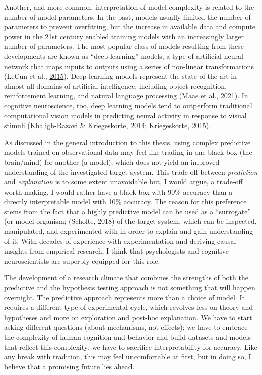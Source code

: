 \documentclass[11pt,american,]{memoir} %
\begin{document}
Another, and more common, interpretation of model complexity is related to the number of model parameters. In the past, models usually limited the number of parameters to prevent overfitting, but the increase in available data and compute power in the 21st century enabled training models with an increasingly larger number of parameters. The most popular class of models resulting from these developments are known as ``deep learning'' models, a type of artificial neural network that maps inputs to outputs using a series of non-linear transformations (LeCun et al., \protect\hyperlink{ref-LeCun2015-xa}{2015}). Deep learning models represent the state-of-the-art in almost all domains of artificial intelligence, including object recognition, reinforcement learning, and natural language processing (Maas et al., \protect\hyperlink{ref-Van_der_Maas2021-rx}{2021}). In cognitive neuroscience, too, deep learning models tend to outperform traditional computational vision models in predicting neural activity in response to visual stimuli (Khaligh-Razavi \& Kriegeskorte, \protect\hyperlink{ref-khaligh2014deep}{2014}; Kriegeskorte, \protect\hyperlink{ref-Kriegeskorte2015-qi}{2015}).

As discussed in the general introduction to this thesis, using complex predictive models trained on observational data may feel like trading in one black box (the brain/mind) for another (a model), which does not yield an improved understanding of the investigated target system. This trade-off between \emph{prediction} and \emph{explanation} is to some extent unavoidable but, I would argue, a trade-off worth making. I would rather have a black box with 90\% accuracy than a directly interpretable model with 10\% accuracy. The reason for this preference stems from the fact that a highly predictive model can be used as a ``surrogate'' (or model organism; (Scholte, 2018) of the target system, which can be inspected, manipulated, and experimented with in order to explain and gain understanding of it. With decades of experience with experimentation and deriving causal insights from empirical research, I think that psychologists and cognitive neuroscientists are superbly equipped for this role.

The development of a research climate that combines the strengths of both the predictive and the hypothesis testing approach is not something that will happen overnight. The predictive approach represents more than a choice of model. It requires a different type of experimental cycle, which revolves less on theory and hypotheses and more on exploration and post-hoc explanation. We have to start asking different questions (about mechanisms, not effects); we have to embrace the complexity of human cognition and behavior and build datasets and models that reflect this complexity; we have to sacrifice interpretability for accuracy. Like any break with tradition, this may feel uncomfortable at first, but in doing so, I believe that a promising future lies ahead.
\end{document}
